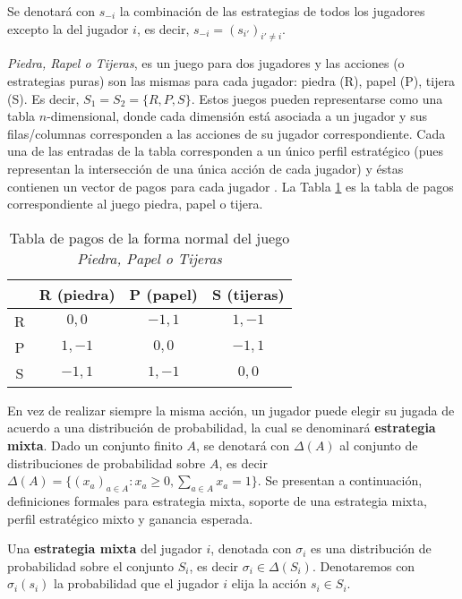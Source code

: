 Se denotará con $s_{-i}$ la combinación de las estrategias de todos los jugadores excepto la del jugador $i$, es decir, $s_{-i} = (s_{i'})_{i' \neq i}$.

\textit{Piedra, Rapel o Tijeras}, es un juego para dos jugadores y las acciones (o estrategias puras) son las mismas para cada jugador: piedra (R), papel (P), tijera (S). Es decir, $S_1 = S_2 = \{R, P, S \}$. Estos juegos pueden representarse como una tabla $n$-dimensional, donde cada dimensión está asociada a un jugador y sus filas/columnas corresponden a las acciones de su jugador correspondiente. Cada una de las entradas de la tabla corresponden a un único perfil estratégico (pues representan la intersección de una única acción de cada jugador) y éstas contienen un vector de pagos para cada jugador \cite{bib:introductionCFR}. La Tabla \ref{table:pago-RPS} es la tabla de pagos correspondiente al juego piedra, papel o tijera.

\begin{table}[h]
\begin{center}
\caption{Tabla de pagos de la forma normal del juego \textit{Piedra, Papel o Tijeras}}
\label{table:pago-RPS}
\begin{tabular}{c | c | c | c |}
  & R (piedra) & P (papel) & S (tijeras) \\ \hline
R & $0,0$ & $-1,1$ & $1,-1$ \\ \hline
P & $1,-1$ & $0,0$ & $-1,1$ \\ \hline
S & $-1,1$ & $1,-1$ & $0,0$ \\ \hline
\end{tabular}
\end{center}
\end{table}

En vez de realizar siempre la misma acción, un jugador puede elegir su jugada de acuerdo a una distribución de probabilidad, la cual se denominará \textbf{estrategia mixta}. Dado un conjunto finito $A$, se denotará con $\Delta(A)$ al conjunto de distribuciones de probabilidad sobre $A$, es decir $\Delta(A) = \{ (x_a)_{a \in A} : x_a \geq 0, \sum_{a \in A} x_a = 1\}$. Se presentan a continuación, definiciones formales para estrategia mixta, soporte de una estrategia mixta, perfil estratégico mixto y ganancia esperada.

\begin{definition} Una \textbf{estrategia mixta} del jugador $i$, denotada con $\sigma_i$ es una distribución de probabilidad sobre el conjunto $S_i$, es decir $\sigma_i \in \Delta(S_i)$. Denotaremos con $\sigma_i(s_i)$ la probabilidad que el jugador $i$ elija la acción $s_i \in S_i$. 
\end{definition}

